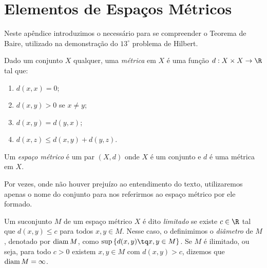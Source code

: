 \section{Elementos de Espaços Métricos}

Neste apêndice introduzimos o necessário para se compreender o Teorema de Baire, utilizado na demonstração do \( 13^{ \circ } \) problema de Hilbert.

\begin{defn}
    Dado um conjunto \( X \) qualquer, uma \emph{métrica} em \( X \) é uma função \( d : X \times X \to \R \) tal que:
    \begin{enumerate}[label=\roman*)]
        \item \( d(x, x) = 0 \);
        \item \( d(x, y) > 0 \) se \( x \neq y \);
        \item \( d(x, y) = d(y, x) \);
        \item \( d(x, z) \leq d(x, y) + d(y, z) \).
    \end{enumerate}
\end{defn}


\begin{defn}
    Um \emph{espaço métrico} é um par \( ( X, d ) \) onde \( X \) é um conjunto e \( d \) é uma métrica em \( X \).
\end{defn}

    Por vezes, onde não houver prejuízo ao entendimento do texto, utilizaremos apenas o nome do conjunto para nos referirmos ao espaço métrico por ele formado.

\begin{defn}
    Um suconjunto \( M \) de um espaço métrico \( X \) é dito \emph{limitado} se existe \( c \in \R \) tal que \( d(x, y) \leq c \) para todos \( x, y \in M \).
    Nesse caso, o definimimos o \emph{diâmetro} de \( M \), denotado por \( \operatorname{diam} M \), como \( \sup \left\{ d(x, y) \tq x, y \in M \right\} \).
    Se \( M \) é ilimitado, ou seja, para todo \( c > 0 \) existem \( x, y \in M \) com \( d(x, y) > c \), dizemos que \( \operatorname{diam} M = \infty \).
\end{defn}


